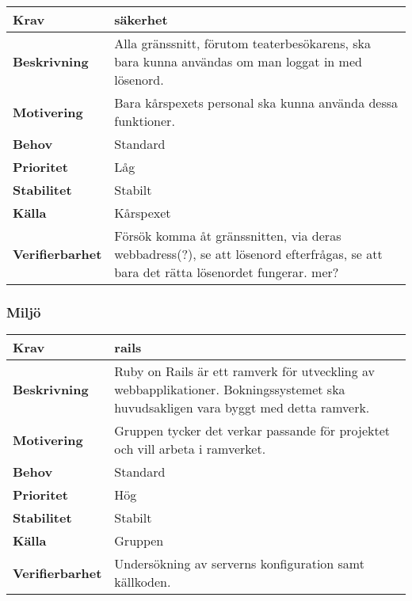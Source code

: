 \documentclass[a4paper, twoside, 11pt, titlepage]{article}
\begin{document}
		\begin{tabular} { | p{3cm} | p{12.2cm} | }
			\hline
			\textbf{Krav} & säkerhet  \\
			\hline
			\textbf{Beskrivning} & Alla gränssnitt, förutom teaterbesökarens, ska bara kunna användas om man loggat in med lösenord.  \\
			\hline
			\textbf{Motivering} & Bara kårspexets personal ska kunna använda dessa funktioner.  \\
			\hline
			\textbf{Behov} & Standard  \\
			\hline
			\textbf{Prioritet} & Låg  \\
			\hline
			\textbf{Stabilitet} & Stabilt  \\
			\hline
			\textbf{Källa} & Kårspexet  \\
			\hline
			\textbf{Verifierbarhet} & Försök komma åt gränssnitten, via deras webbadress(?), se att lösenord efterfrågas, se att bara det rätta lösenordet fungerar. mer?  \\
			\hline
		\end{tabular}


	\subsubsection{Miljö}


		\begin{tabular} { | p{3cm} | p{12.2cm} | }
			\hline
			\textbf{Krav} & rails  \\
			\hline
			\textbf{Beskrivning} & Ruby on Rails är ett ramverk för utveckling av webbapplikationer. Bokningssystemet ska huvudsakligen vara byggt med detta ramverk.  \\
			\hline
			\textbf{Motivering} & Gruppen tycker det verkar passande för projektet och vill arbeta i ramverket.  \\
			\hline
			\textbf{Behov} & Standard  \\
			\hline
			\textbf{Prioritet} & Hög  \\
			\hline
			\textbf{Stabilitet} & Stabilt  \\
			\hline
			\textbf{Källa} & Gruppen  \\
			\hline
			\textbf{Verifierbarhet} & Undersökning av serverns konfiguration samt källkoden.  \\
			\hline
		\end{tabular}
\end{document}
